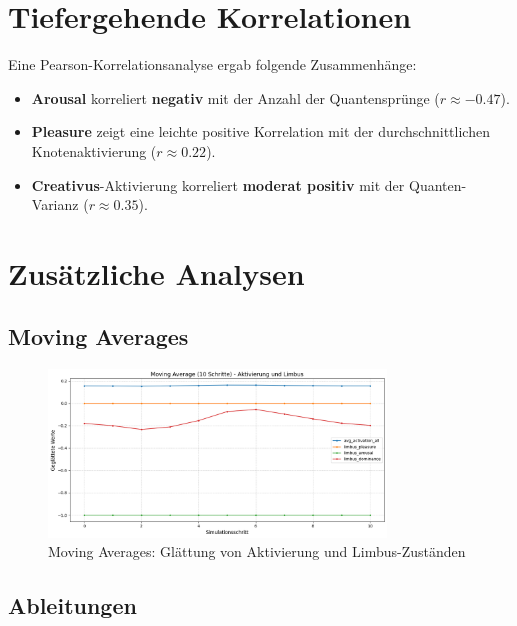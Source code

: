 \documentclass[11pt,a4paper]{article}
\begin{document}
\section{Tiefergehende Korrelationen}
\label{sec:korrelationen}

Eine Pearson-Korrelationsanalyse ergab folgende Zusammenhänge:
\begin{itemize}
    \item \textbf{Arousal} korreliert \textbf{negativ} mit der Anzahl der Quantensprünge ($r \approx -0.47$).
    \item \textbf{Pleasure} zeigt eine leichte positive Korrelation mit der durchschnittlichen Knotenaktivierung ($r \approx 0.22$).
    \item \textbf{Creativus}-Aktivierung korreliert \textbf{moderat positiv} mit der Quanten-Varianz ($r \approx 0.35$).
\end{itemize}

\section{Zusätzliche Analysen}
\label{sec:additional}

\subsection{Moving Averages}

\begin{figure}[H]
    \centering
    \includegraphics[width=0.8\textwidth]{moving_average_timeseries.png}
    \caption{Moving Averages: Glättung von Aktivierung und Limbus-Zuständen}
    \label{fig:moving_averages}
\end{figure}

\subsection{Ableitungen}
\end{document}
